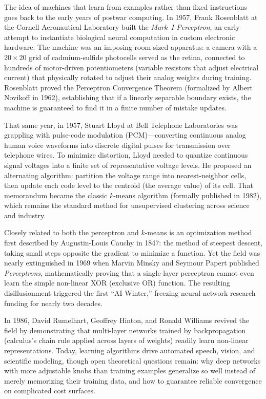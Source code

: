 \begin{historybox}
The idea of machines that learn from examples rather than fixed instructions
goes back to the early years of postwar computing. In 1957, Frank Rosenblatt at
the Cornell Aeronautical Laboratory built the \emph{Mark~I Perceptron}, an early
attempt to instantiate biological neural computation in custom electronic hardware.
The machine was an imposing room-sized apparatus: a camera with a $20\times 20$ grid
of cadmium-sulfide photocells served as the retina, connected to hundreds of
motor-driven potentiometers (variable resistors that adjust electrical current)
that physically rotated to adjust their analog weights during training. Rosenblatt
proved the Perceptron Convergence Theorem (formalized by Albert Novikoff in 1962),
establishing that if a linearly separable boundary exists, the machine is
guaranteed to find it in a finite number of mistake updates.

That same year, in 1957, Stuart Lloyd at Bell Telephone Laboratories was grappling
with pulse-code modulation (PCM)---converting continuous analog human voice
waveforms into discrete digital pulses for transmission over telephone wires.
To minimize distortion, Lloyd needed to quantize continuous signal voltages into a
finite set of representative voltage levels. He proposed an alternating algorithm:
partition the voltage range into nearest-neighbor cells, then update each code
level to the centroid (the average value) of its cell. That memorandum became the
classic $k$-means algorithm (formally published in 1982), which remains the standard
method for unsupervised clustering across science and industry.

Closely related to both the perceptron and $k$-means is an optimization method
first described by Augustin-Louis Cauchy in 1847: the method of steepest
descent, taking small steps opposite the gradient to minimize a function. Yet the
field was nearly extinguished in 1969 when Marvin Minsky and Seymour Papert
published \emph{Perceptrons}, mathematically proving that a single-layer perceptron
cannot even learn the simple non-linear \textsc{XOR} (exclusive OR) function. The
resulting disillusionment triggered the first ``AI Winter,'' freezing neural
network research funding for nearly two decades.

In 1986, David Rumelhart, Geoffrey Hinton, and Ronald Williams revived the field by
demonstrating that multi-layer networks trained by backpropagation (calculus's
chain rule applied across layers of weights) readily learn non-linear representations.
Today, learning algorithms drive automated speech, vision, and scientific modeling,
though open theoretical questions remain: why deep networks with more adjustable knobs than training examples
generalize so well instead of merely memorizing their training data, and how to
guarantee reliable convergence on complicated cost surfaces.
\end{historybox}

